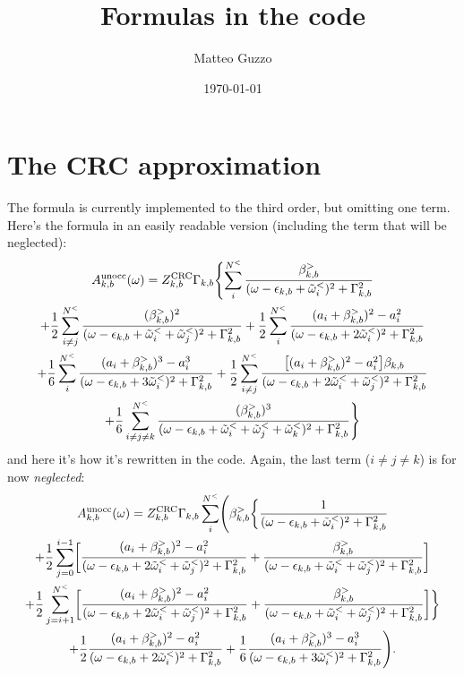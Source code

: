 \documentclass[a4paper,12pt]{article}
\title{Formulas in the code}
\author{Matteo Guzzo}
\date{\today}
\begin{document}
\maketitle

\tableofcontents

\section{The CRC approximation}

The formula is currently implemented to the third order, but omitting one term. 
Here's the formula in an easily readable version (including the term that will be neglected):
\begin{multline}
 A_{k,b}^\textnormal{unocc}(\omega) = Z_{k,b}^\textnormal{CRC} \Gamma_{k,b} \Biggl\{ 
  \sum_i^{N^<} \frac{\beta_{k,b}^>}{(\omega - \epsilon_{k,b} + \tilde\omega_i^<)^2 + \Gamma_{k,b}^2} \\
 + \frac12 \sum_{i\neq j}^{N^<} 
\frac{(\beta_{k,b}^>)^2}{(\omega - \epsilon_{k,b} + \tilde\omega_i^< + \tilde\omega_j^<)^2 + \Gamma_{k,b}^2}
 + \frac12 \sum_i^{N^<} \frac{(a_i + \beta_{k,b}^>)^2 - a_i^2}{(\omega - \epsilon_{k,b} + 2 \tilde\omega_i^<)^2 + \Gamma_{k,b}^2} \\
 + \frac16 \sum_i^{N^<} \frac{(a_i + \beta_{k,b}^>)^3 - a_i^3}{(\omega - \epsilon_{k,b} + 3 \tilde\omega_i^<)^2 + \Gamma_{k,b}^2} 
 + \frac12 \sum_{i\neq j}^{N^<} \frac{\bigl[(a_i + \beta_{k,b}^>)^2 - a_i^2\bigr] \beta_{k,b} }
  {(\omega - \epsilon_{k,b} + 2\tilde\omega_i^< + \tilde\omega_j^<)^2 + \Gamma_{k,b}^2} \\
 + \frac16 \sum_{i\neq j\neq k}^{N^<} 
\frac{(\beta_{k,b}^>)^3}{(\omega - \epsilon_{k,b} + \tilde\omega_i^< + \tilde\omega_j^< + \tilde\omega_k^<)^2 + \Gamma_{k,b}^2}
\Biggr\}
\end{multline}
and here it's how it's rewritten in the code. Again, the last term ($i\neq j\neq k$) is for now \emph{neglected}: 
\begin{multline}
 A_{k,b}^\textnormal{unocc}(\omega) = Z_{k,b}^\textnormal{CRC} \Gamma_{k,b}  \sum_i^{N^<} \Biggl( \beta_{k,b}^> \biggl\{
 \frac1{(\omega - \epsilon_{k,b} + \tilde\omega_i^<)^2 + \Gamma_{k,b}^2}  \\ 
  + \frac12 \sum_{j=0}^{i-1} \biggl[ \frac{(a_i + \beta_{k,b}^>)^2 - a_i^2 }
  {(\omega - \epsilon_{k,b} + 2 \tilde\omega_i^< + \tilde\omega_j^<)^2 + \Gamma_{k,b}^2} 
 + \frac{\beta_{k,b}^>}{(\omega - \epsilon_{k,b} + \tilde\omega_i^< + \tilde\omega_j^<)^2 + \Gamma_{k,b}^2}  \biggr] \\ 
  + \frac12 \sum_{j=i+1}^{N^<} \biggl[ \frac{(a_i + \beta_{k,b}^>)^2 - a_i^2 }
  {(\omega - \epsilon_{k,b} + 2 \tilde\omega_i^< + \tilde\omega_j^<)^2 + \Gamma_{k,b}^2} 
 + \frac{\beta_{k,b}^>}{(\omega - \epsilon_{k,b} + \tilde\omega_i^< + \tilde\omega_j^<)^2 + \Gamma_{k,b}^2}
 \biggr] \biggr\} \\
 + \frac12 \frac{(a_i + \beta_{k,b}^>)^2 - a_i^2}{(\omega - \epsilon_{k,b} + 2 \tilde\omega_i^<)^2 + \Gamma_{k,b}^2} 
 + \frac16 \frac{(a_i + \beta_{k,b}^>)^3 - a_i^3}{(\omega - \epsilon_{k,b} + 3 \tilde\omega_i^<)^2 + \Gamma_{k,b}^2} 
 \Biggl) . 
\end{multline}
\end{document}
